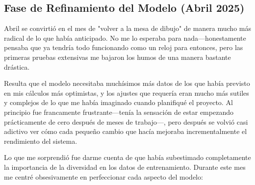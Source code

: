 \subsection{Fase de Refinamiento del Modelo (Abril 2025)}

Abril se convirtió en el mes de "volver a la mesa de dibujo" de manera mucho más radical de lo que había anticipado. No me lo esperaba para nada—honestamente pensaba que ya tendría todo funcionando como un reloj para entonces, pero las primeras pruebas extensivas me bajaron los humos de una manera bastante drástica.

Resulta que el modelo necesitaba muchísimos más datos de los que había previsto en mis cálculos más optimistas, y los ajustes que requería eran mucho más sutiles y complejos de lo que me había imaginado cuando planifiqué el proyecto. Al principio fue francamente frustrante—tenía la sensación de estar empezando prácticamente de cero después de meses de trabajo—, pero después se volvió casi adictivo ver cómo cada pequeño cambio que hacía mejoraba incrementalmente el rendimiento del sistema.

Lo que me sorprendió fue darme cuenta de que había subestimado completamente la importancia de la diversidad en los datos de entrenamiento. Durante este mes me centré obsesivamente en perfeccionar cada aspecto del modelo:

